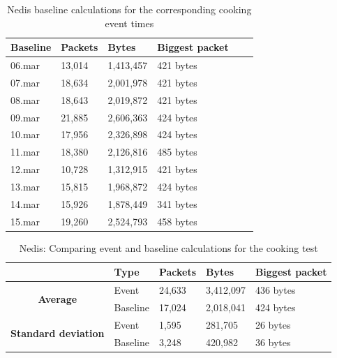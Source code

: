 \begin{table}[H]
    \centering
    \caption{Nedis baseline calculations for the corresponding cooking event times}
    \begin{tabular}{|l|l|l|l|l|l|}
    \hline
        \textbf{Baseline} & \textbf{Packets} & \textbf{Bytes} & \textbf{Biggest packet} \\ \hline
        06.mar & 13,014 & 1,413,457 & 421 bytes \\ \hline
        07.mar & 18,634 & 2,001,978 & 421 bytes \\ \hline
        08.mar & 18,643 & 2,019,872 & 421 bytes \\ \hline
        09.mar & 21,885 & 2,606,363 & 424 bytes \\ \hline
        10.mar & 17,956 & 2,326,898 & 424 bytes \\ \hline
        11.mar & 18,380 & 2,126,816 & 485 bytes \\ \hline
        12.mar & 10,728 & 1,312,915 & 421 bytes \\ \hline
        13.mar & 15,815 & 1,968,872 & 424 bytes \\ \hline
        14.mar & 15,926 & 1,878,449 & 341 bytes \\ \hline
        15.mar & 19,260 & 2,524,793 & 458 bytes \\ \hline
    \end{tabular}
    \label{tab:NedisBaselineCookingCalculations}
\end{table}

\begin{table}[H]
    \centering
    \caption{Nedis: Comparing event and baseline calculations for the cooking test}
    \begin{tabular}{c|l|l|l|l|}
        \cline{2-5}
        \multicolumn{1}{l|}{}                                              & \textbf{Type} & \textbf{Packets} & \textbf{Bytes} & \textbf{Biggest packet} \\ \hline
        \multicolumn{1}{|c|}{\multirow{2}{*}{\textbf{Average}}}            & Event         & 24,633             & 3,412,097       & 436 bytes               \\ \cline{2-5} 
        \multicolumn{1}{|c|}{}                                             & Baseline      & 17,024             & 2,018,041       & 424 bytes                \\ \hline
        \multicolumn{1}{|c|}{\multirow{2}{*}{\textbf{Standard deviation}}} & Event         & 1,595              & 281,705         & 26 bytes                 \\ \cline{2-5} 
        \multicolumn{1}{|c|}{}                                             & Baseline      & 3,248              & 420,982         & 36 bytes               \\ \hline          
    \end{tabular}
    \label{tab:NedisComparingBaselineAndCookingCalculations}
\end{table}

